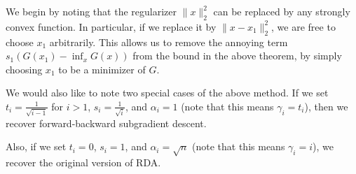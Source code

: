 We begin by noting that the regularizer $\|x\|_2^2$ can be replaced by any strongly convex function. In particular,
if we replace it by $\|x - x_1\|_2^2$, we are free to choose $x_1$ arbitrarily. This allows us to remove the
annoying term $s_1(G(x_1) - \inf_x G(x))$ from the bound in the above theorem, by simply choosing $x_1$ to be a minimizer
of $G$.

We would also like to note two special cases of the above method. If we set $t_i = \frac{1}{\sqrt{i-1}}$ for $i > 1$,
$s_i = \frac{1}{\sqrt{i}}$, and $\alpha_i = 1$ (note that this means $\gamma_i = t_i$), 
then we recover forward-backward subgradient descent.

Also, if we set $t_i = 0$, $s_i = 1$, and $\alpha_i = \sqrt{n}$ (note that this means $\gamma_i = i$), we recover the
original version of RDA.
